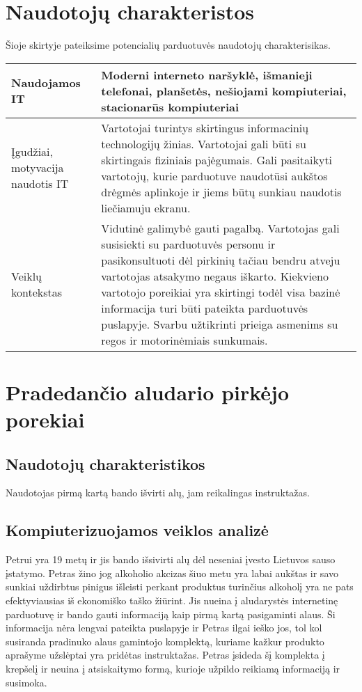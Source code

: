 \documentclass[oneside]{VUMIFPSkursinis}
\begin{document}
\section{Naudotojų charakteristos}
Šioje skirtyje pateiksime potencialių parduotuvės naudotojų charakterisikas.

\begin{center}
\begin{tabular}{ | m{7em} | m{15cm}| } 
\hline
Naudojamos IT & Moderni interneto naršyklė, išmanieji telefonai, planšetės, nešiojami kompiuteriai, stacionarūs kompiuteriai  \\ 
\hline
Įgudžiai, motyvacija naudotis IT & Vartotojai turintys skirtingus informacinių technologijų žinias. Vartotojai gali būti su skirtingais fiziniais pajėgumais. Gali pasitaikyti vartotojų, kurie parduotuve naudotūsi aukštos drėgmės aplinkoje ir jiems būtų sunkiau naudotis liečiamuju ekranu.  \\ 
\hline
Veiklų kontekstas & Vidutinė galimybė gauti pagalbą. Vartotojas gali susisiekti su parduotuvės personu ir pasikonsultuoti dėl pirkinių tačiau bendru atveju vartotojas atsakymo negaus iškarto. Kiekvieno vartotojo poreikiai yra skirtingi todėl visa bazinė informacija turi būti pateikta parduotuvės puslapyje. Svarbu užtikrinti prieiga asmenims su regos ir motorinėmiais sunkumais. \\ 
\hline
\end{tabular}
\end{center}
\section{Pradedančio aludario pirkėjo porekiai}
	\subsection{Naudotojų charakteristikos}
		Naudotojas pirmą kartą bando išvirti alų, jam reikalingas instruktažas.
	\subsection{Kompiuterizuojamos veiklos analizė}
		Petrui yra 19 metų ir jis bando išsivirti alų dėl neseniai įvesto Lietuvos sauso įstatymo.
		Petras žino jog alkoholio akcizas šiuo metu yra labai aukštas ir savo sunkiai uždirbtus pinigus išleisti perkant produktus turinčius alkoholį yra ne pats efektyviausias iš ekonomiško taško žiūrint.
		Jis nueina į aludarystės internetinę parduotuvę ir bando gauti informaciją kaip pirmą kartą pasigaminti alaus.
		Ši informacija nėra lengvai pateikta puslapyje ir Petras ilgai ieško jos, tol kol susiranda pradinuko alaus gamintojo komplektą, kuriame kažkur produkto aprašyme užslėptai yra pridėtas instruktažas.
		Petras įsideda šį komplekta į krepšelį ir neuina į atsiskaitymo formą, kurioje užpildo reikiamą informaciją ir susimoka.
\end{document}
